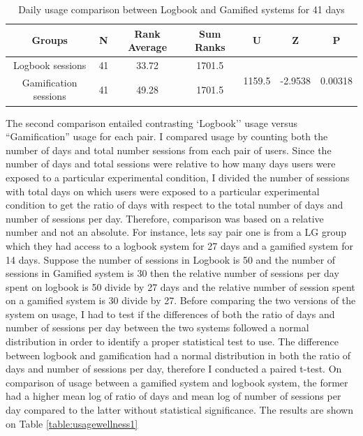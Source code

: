 \begin{table}[h!]
  \begin{center}
    \caption{Daily usage comparison between Logbook and Gamified systems for 41 days}
    \label{table:usagedays}
	\begin{tabular}{|c|c|c|c|c|c|c|}
		\hline
		Groups&N&Rank Average&Sum Ranks&U&Z&P\\
		\hline
   		Logbook sessions&41&33.72&1701.5&\multirow{2}{*}{1159.5}&\multirow{2}{*}{-2.9538}& \multirow{2}{*}{0.00318}\\\cline{1-4} 
   		 		    Gamification sessions&41&49.28& 1701.5&&&\\
\hline
	\end{tabular}
  \end{center}
\end{table}
\newline 
The second comparison entailed contrasting `Logbook'' usage versus ``Gamification'' usage for each pair. I compared usage by counting both the number of days and total number sessions from each pair of users. Since the number of days and total sessions were relative to how many days users were exposed to a particular experimental condition, I divided the number of sessions with total days on which users were exposed to a particular experimental condition to get the ratio of days with respect to the total number of days and number of sessions per day. Therefore, comparison was based on a relative number and not an absolute. For instance, lets say pair one is from a LG group which they had access to a logbook system for 27 days and a gamified system for 14 days. Suppose the number of sessions in Logbook is 50 and the number of sessions in Gamified system is 30 then the relative number of sessions per day spent on logbook is 50 divide by 27 days and the relative number of session spent on  a gamified system is 30 divide by 27. Before comparing the two versions of the system on usage, I had to test if the differences of both the ratio of days and number of sessions per day between the two systems followed a normal distribution in order to identify a proper statistical test to use. The difference between logbook and gamification had a normal distribution in both the ratio of days and number of sessions per day, therefore I conducted a paired t-test. On comparison of usage between a gamified system and logbook system, the former had a higher mean log of ratio of days  and mean log of number of sessions per day compared to the latter without statistical significance.
The results are shown on Table \ref{table:usagewellness1}

